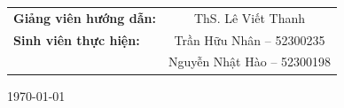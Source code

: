 {\begin{frame}[plain]
    \vspace{0.4cm}
    
    {\color{white}\fontsize{6}{7}\selectfont
    \begin{tabular}{lc}
        \textbf{Giảng viên hướng dẫn:} & {\color{white!80}ThS. Lê Viết Thanh} \\[0.12cm]
        \textbf{Sinh viên thực hiện:} & {\color{white!80}Trần Hữu Nhân -- 52300235} \\[0.05cm]
        & {\color{white!80}Nguyễn Nhật Hào -- 52300198}
    \end{tabular}
    }
    
    \vspace{0.45cm}
    
    {\color{white!50}\fontsize{5}{6}\selectfont\today}
    
\end{frame}
}
